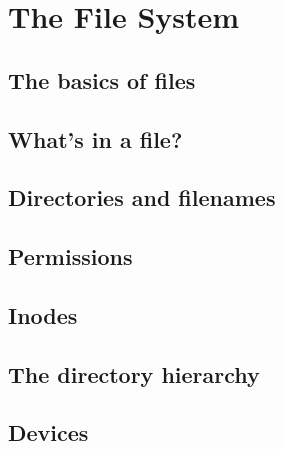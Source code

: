 \chapter{The File System}
\label{chap:the_file_system}

\section{The basics of files}
\section{What's in a file?}
\section{Directories and filenames}
\section{Permissions}
\section{Inodes}
\section{The directory hierarchy}
\section{Devices}
